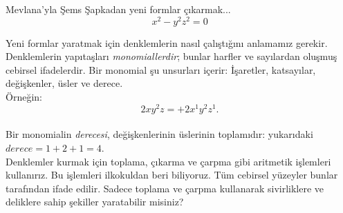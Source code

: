 \begin{surferPage}{Mevlana'yla Şems}
Şapkadan yeni formlar çıkarmak... \\
\smallskip
\[x^2	- y^2z^2	= 0\]

\singlespacing
Yeni formlar yaratmak için denklemlerin nasıl çalıştığını anlamamız gerekir. Denklemlerin yapıtaşları {\it monomiallerdir}; bunlar harfler ve sayılardan oluşmuş cebirsel ifadelerdir.
\singlespacing
Bir monomial şu unsurları içerir:
İşaretler, katsayılar, değişkenler, üsler ve derece.\\
\singlespacing
Örneğin: 
\smallskip
\[2xy^2z = +2x^1y^2z^1.\]
\\
\smallskip
Bir monomialin  {\it derecesi}, değişkenlerinin üslerinin toplamıdır: yukarıdaki $derece = 1+2+1=4$.  \\
\singlespacing
Denklemler kurmak için toplama, çıkarma ve çarpma gibi aritmetik işlemleri kullanırız. Bu işlemleri ilkokuldan beri biliyoruz. Tüm cebirsel yüzeyler bunlar tarafından ifade edilir.
\singlespacing
Sadece toplama ve çarpma kullanarak sivirliklere ve deliklere sahip şekiller  yaratabilir misiniz?
\end{surferPage}
